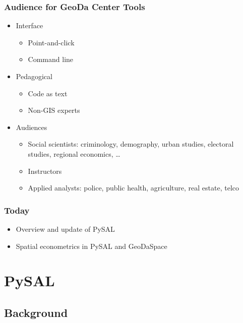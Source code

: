 \begin{frame}
	\frametitle{Audience for GeoDa Center Tools}
 \begin{itemize}
 \item Interface
 \begin{itemize}
 \item Point-and-click
 \item Command line
 \end{itemize}
 \item Pedagogical
 \begin{itemize}
 \item Code as text
 \item Non-GIS experts
 \end{itemize}
 \item Audiences
 \begin{itemize}
 \item Social scientists: criminology, demography, urban studies, electoral studies, regional economics, \ldots
 \item Instructors
 \item Applied analysts: police, public health, agriculture, real estate, telco
 \end{itemize}
 \end{itemize}
 \end{frame} 

\begin{frame}
	\frametitle{Today}
 \begin{itemize}
 \item Overview and update of PySAL
 \item Spatial econometrics in PySAL and GeoDaSpace
 \end{itemize}
 \end{frame} 


\section{PySAL} 

\subsection{Background} 

